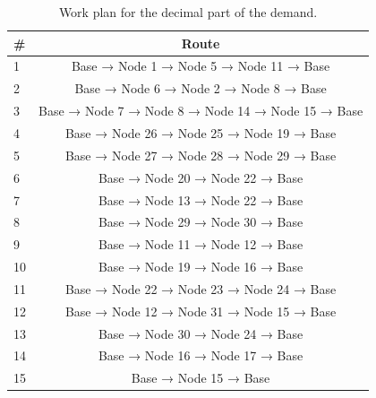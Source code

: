 \documentclass{amsart}
\begin{document}
        \begin{table}[!htp]\centering
        \scriptsize
        \begin{tabular}{lc} \toprule
        \textbf{\#} & \textbf{Route} \\\midrule
        1 & Base → Node 1 → Node 5 → Node 11 → Base \\
        2 & Base → Node 6  → Node 2 → Node 8 → Base \\
        3 & Base → Node 7 → Node 8 → Node 14 → Node 15 → Base \\
        4 & Base → Node 26 → Node 25 → Node 19 → Base \\
        5 & Base → Node 27 → Node 28 → Node 29 → Base \\
        6 & Base → Node 20 → Node 22 → Base \\
        7 & Base → Node 13 → Node 22 → Base \\
        8 & Base → Node 29 → Node 30 → Base \\
        9 & Base → Node 11 → Node 12 → Base \\
        10 & Base → Node 19 → Node 16 → Base \\
        11 & Base → Node 22 → Node 23 → Node 24 → Base \\
        12 & Base → Node 12 → Node 31 → Node 15 → Base \\
        13 & Base → Node 30 → Node 24 → Base \\
        14 & Base → Node 16 → Node 17 → Base \\
        15 & Base → Node 15 → Base \\
        \bottomrule
        \end{tabular}
        \vspace{10pt}
        \caption{Work plan for the decimal part of the demand.}\label{tab:ParteDecimal}
    \end{table}
\end{document}
